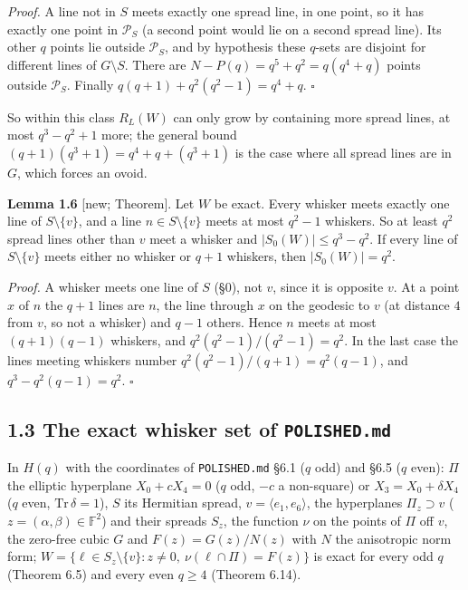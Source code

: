 \documentclass[
  10pt,
]{article}
\begin{document}
\emph{Proof.} A line not in \(S\) meets exactly one spread line, in one
point, so it has exactly one point in \(\mathcal P_S\) (a second point
would lie on a second spread line). Its other \(q\) points lie outside
\(\mathcal P_S\), and by hypothesis these \(q\)-sets are disjoint for
different lines of \(G\setminus S\). There are
\(N-P(q)=q^5+q^2=q(q^4+q)\) points outside \(\mathcal P_S\). Finally
\(q(q+1)+q^2(q^2-1)=q^4+q\). \(\square\)

So within this class \(R_L(W)\) can only grow by containing more spread
lines, at most \(q^3-q^2+1\) more; the general bound
\((q+1)(q^3+1)=q^4+q+(q^3+1)\) is the case where all spread lines are in
\(G\), which forces an ovoid.

\textbf{Lemma 1.6} {[}new; Theorem{]}. Let \(W\) be exact. Every whisker
meets exactly one line of \(S\setminus\{v\}\), and a line
\(n\in S\setminus\{v\}\) meets at most \(q^2-1\) whiskers. So at least
\(q^2\) spread lines other than \(v\) meet a whisker and
\(|S_0(W)|\le q^3-q^2\). If every line of \(S\setminus\{v\}\) meets
either no whisker or \(q+1\) whiskers, then \(|S_0(W)|=q^2\).

\emph{Proof.} A whisker meets one line of \(S\) (§0), not \(v\), since
it is opposite \(v\). At a point \(x\) of \(n\) the \(q+1\) lines are
\(n\), the line through \(x\) on the geodesic to \(v\) (at distance
\(4\) from \(v\), so not a whisker) and \(q-1\) others. Hence \(n\)
meets at most \((q+1)(q-1)\) whiskers, and \(q^2(q^2-1)/(q^2-1)=q^2\).
In the last case the lines meeting whiskers number
\(q^2(q^2-1)/(q+1)=q^2(q-1)\), and \(q^3-q^2(q-1)=q^2\). \(\square\)

\hypertarget{the-exact-whisker-set-of-polished.md}{%
\subsection{\texorpdfstring{1.3 The exact whisker set of
\texttt{POLISHED.md}}{1.3 The exact whisker set of POLISHED.md}}\label{the-exact-whisker-set-of-polished.md}}

In \(H(q)\) with the coordinates of \texttt{POLISHED.md} §6.1 (\(q\)
odd) and §6.5 (\(q\) even): \(\Pi\) the elliptic hyperplane
\(X_0+cX_4=0\) (\(q\) odd, \(-c\) a non-square) or
\(X_3=X_0+\delta X_4\) (\(q\) even, \(\mathrm{Tr}\,\delta=1\)), \(S\)
its Hermitian spread, \(v=\langle e_1,e_6\rangle\), the hyperplanes
\(\Pi_z\supset v\) (\(z=(\alpha,\beta)\in\mathbb F^2\)) and their
spreads \(S_z\), the function \(\nu\) on the points of \(\Pi\) off
\(v\), the zero-free cubic \(G\) and \(F(z)=G(z)/N(z)\) with \(N\) the
anisotropic norm form;
\(W=\{\ell\in S_z\setminus\{v\}: z\neq0,\ \nu(\ell\cap\Pi)=F(z)\}\) is
exact for every odd \(q\) (Theorem 6.5) and every even \(q\ge4\)
(Theorem 6.14).
\end{document}
